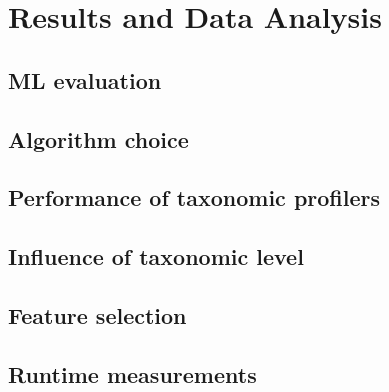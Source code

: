\chapter{Results and Data Analysis}
\label{results} 




\section{ML evaluation}

\section{Algorithm choice}

\section{Performance of taxonomic profilers}

\section{Influence of taxonomic level}

\section{Feature selection}

\section{Runtime measurements}




